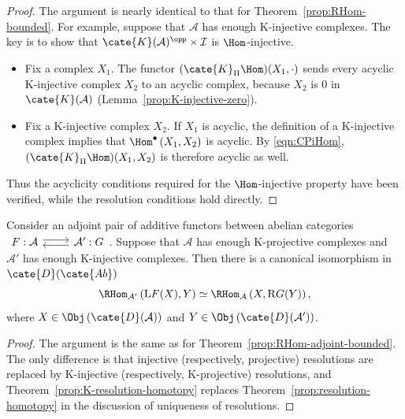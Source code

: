 \begin{proof}
	The argument is nearly identical to that for
	Theorem~\ref{prop:RHom-bounded}. For example, suppose that $\mathcal{A}$
	has enough K-injective complexes. The key is to show that
	$\cate{K}(\mathcal{A})^{\opp}\times\mathcal{I}$ is $\Hom$-injective.
	\begin{itemize}
		\item Fix a complex $X_1$. The functor
		$(\cate{K}_\Pi\Hom)(X_1,\cdot)$ sends every acyclic K-injective complex
		$X_2$ to an acyclic complex, because $X_2$ is $0$ in
		$\cate{K}(\mathcal{A})$ (Lemma~\ref{prop:K-injective-zero}).
		\item Fix a K-injective complex $X_2$. If $X_1$ is acyclic, the
		definition of a K-injective complex implies that
		$\Hom^\bullet\left(X_1,X_2\right)$ is acyclic. By
		\eqref{eqn:CPiHom}, $(\cate{K}_\Pi\Hom)(X_1,X_2)$ is therefore
		acyclic as well.
	\end{itemize}
	Thus the acyclicity conditions required for the $\Hom$-injective property
	have been verified, while the resolution conditions hold directly.
\end{proof}

\begin{theorem}\label{prop:RHom-adjoint}
	Consider an adjoint pair of additive functors between abelian categories
	$\begin{tikzcd}
		F: \mathcal{A} \arrow[r, shift left] & \mathcal{A}' \arrow[l, shift left] : G
	\end{tikzcd}$.
	Suppose that $\mathcal{A}$ has enough K-projective complexes and
	$\mathcal{A}'$ has enough K-injective complexes. Then there is a canonical
	isomorphism in $\cate{D}(\cate{Ab})$
	\[ \RHom_{\mathcal{A'}}\left(\mathrm{L}F(X), Y\right) \simeq \RHom_{\mathcal{A}}\left(X, \mathrm{R}G(Y) \right), \]
	where $X\in\Obj\left(\cate{D}(\mathcal{A})\right)$ and
	$Y\in\Obj\left(\cate{D}(\mathcal{A}')\right)$.
\end{theorem}
\begin{proof}
	The argument is the same as for
	Theorem~\ref{prop:RHom-adjoint-bounded}. The only difference is that
	injective (respectively, projective) resolutions are replaced by
	K-injective (respectively, K-projective) resolutions, and
	Theorem~\ref{prop:K-resolution-homotopy} replaces
	Theorem~\ref{prop:resolution-homotopy} in the discussion of uniqueness of
	resolutions.
\end{proof}

